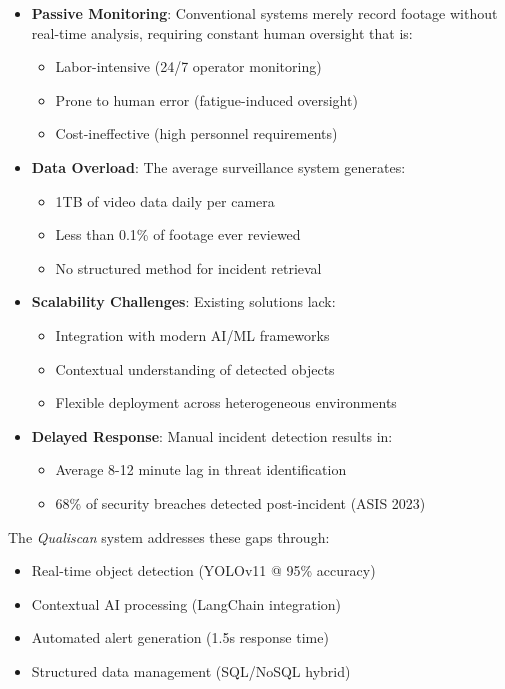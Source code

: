 \documentclass[12pt]{report}
\begin{document}
\begin{itemize}
    \item \textbf{Passive Monitoring}: Conventional systems merely record footage without real-time analysis, requiring constant human oversight that is:
    \begin{itemize}
        \item Labor-intensive (24/7 operator monitoring)
        \item Prone to human error (fatigue-induced oversight)
        \item Cost-ineffective (high personnel requirements)
    \end{itemize}

    \item \textbf{Data Overload}: The average surveillance system generates:
    \begin{itemize}
        \item 1TB of video data daily per camera
        \item Less than 0.1\% of footage ever reviewed
        \item No structured method for incident retrieval
    \end{itemize}

    \item \textbf{Scalability Challenges}: Existing solutions lack:
    \begin{itemize}
        \item Integration with modern AI/ML frameworks
        \item Contextual understanding of detected objects
        \item Flexible deployment across heterogeneous environments
    \end{itemize}

    \item \textbf{Delayed Response}: Manual incident detection results in:
    \begin{itemize}
        \item Average 8-12 minute lag in threat identification
        \item 68\% of security breaches detected post-incident (ASIS 2023)
    \end{itemize}
\end{itemize}

\vspace{5pt}
The \textit{Qualiscan} system addresses these gaps through:
\begin{itemize}
    \item Real-time object detection (YOLOv11 @ 95\% accuracy)
    \item Contextual AI processing (LangChain integration)
    \item Automated alert generation (1.5s response time)
    \item Structured data management (SQL/NoSQL hybrid)
\end{itemize}
\end{document}
